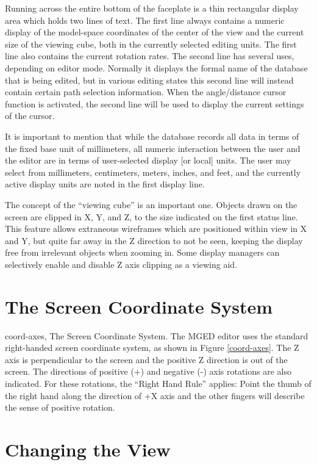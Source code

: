 Running across the entire bottom of the faceplate is a thin rectangular
display area which holds two lines of text.
The first line always contains a numeric display of the model-space
coordinates of the center of the view and the current size of
the viewing cube, both in the currently selected editing units.
The first line also contains the current rotation rates.
The second line has several uses, depending on editor mode.
Normally it displays the formal name of the database that is being
edited, but in various editing states this second line will instead
contain certain path selection information.
When the angle/distance cursor function is activated, the second
line will be used to display the current settings of the cursor.

It is important to mention that while the database records all
data in terms of the fixed base unit of millimeters, all numeric interaction between
the user and the editor are in terms of user-selected display [or local] units.
The user may select from millimeters, centimeters, meters, inches, and
feet, and the currently active display units are noted in the first
display line.

The concept of the ``viewing cube'' is an important one.
Objects drawn on the screen are clipped in X, Y, and Z, to the size
indicated on the first status line.
This feature allows extraneous wireframes which are positioned within view
in X and Y, but quite far away in the Z direction to not be seen,
keeping the display free from irrelevant objects when zooming in.
Some display managers can selectively enable and disable Z axis clipping
as a viewing aid.

\section{The Screen Coordinate System}

\mfig coord-axes, The Screen Coordinate System.
The MGED editor uses the standard right-handed
screen coordinate system,
as shown in Figure \ref{coord-axes}.
The Z axis is perpendicular to the screen and the positive Z direction is
out of the screen.  The directions of positive (+) and negative (-) axis 
rotations are also indicated.  For these rotations, the ``Right
Hand Rule'' applies:  Point the thumb of the right hand along the direction
of +X axis and the other fingers will describe the sense of positive
rotation.

\section{Changing the View}

